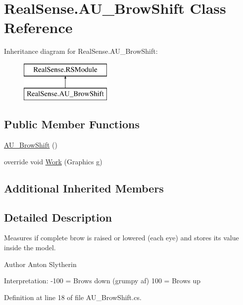 \hypertarget{class_real_sense_1_1_a_u___brow_shift}{}\section{Real\+Sense.\+A\+U\+\_\+\+Brow\+Shift Class Reference}
\label{class_real_sense_1_1_a_u___brow_shift}
Inheritance diagram for Real\+Sense.\+A\+U\+\_\+\+Brow\+Shift\+:\begin{figure}[H]
\begin{center}
\leavevmode
\includegraphics[height=2.000000cm]{class_real_sense_1_1_a_u___brow_shift}
\end{center}
\end{figure}
\subsection*{Public Member Functions}
\begin{DoxyCompactItemize}
\item 
\hyperlink{class_real_sense_1_1_a_u___brow_shift_a65b13018204e75f590f8422b0436e944}{A\+U\+\_\+\+Brow\+Shift} ()
\item 
override void \hyperlink{class_real_sense_1_1_a_u___brow_shift_a81ed7b844c217d3092412e0f53378dd5}{Work} (Graphics g)
\end{DoxyCompactItemize}
\subsection*{Additional Inherited Members}


\subsection{Detailed Description}
Measures if complete brow is raised or lowered (each eye) and stores its\textquotesingle{} value inside the model. \begin{DoxyAuthor}{Author}
Anton  Slytherin
\end{DoxyAuthor}
Interpretation\+: -\/100 = Brows down (grumpy af) 100 = Brows up 

Definition at line 18 of file A\+U\+\_\+\+Brow\+Shift.\+cs.



